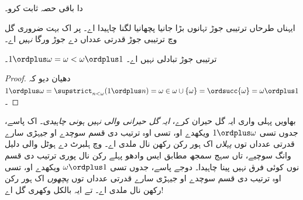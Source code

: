 \documentclass[../../../include/open-logic-section]{subfiles}
\begin{document}
\begin{prob}
 دا باقی حصہ ثابت کرو۔
\end{prob}

ایہناں طرحاں ترتیبی جوڑ تہانوں بڑا جانیا پچھانیا لگنا چاہیدا اے۔ پر اک بہت ضروری گل وچ ترتیبی جوڑ قدرتی عدداں دے جوڑ ورگا \emph{نہیں} اے۔

\begin{prop}
ترتیبی جوڑ {تبادلی نہیں} اے۔ $1 \ordplus  \omega = \omega <
\omega \ordplus  1$۔
\end{prop}

\begin{proof}
دھیان دیو کہ $1 \ordplus  \omega = \supstrict_{n < \omega} (1 \ordplus n)
= \omega \in \omega \cup \{\omega\} = \ordsucc{\omega} = \omega
\ordplus  1$۔
\end{proof}
\noindent
بھاویں پہلی واری ایہ گل حیران کرے، \emph{ایہ گل حیرانی والی نہیں ہونی چاہیدی}۔ اک پاسے، جدوں تسی $1 \ordplus  \omega$ ویکھدے او، تسی اوہ ترتیب دی قسم سوچدے او جیہڑی سارے قدرتی عدداں توں \emph{پہلاں} اک ہور رکن رکھن نال ملدی اے۔  وچ ہلبرٹ دے ہوٹل والی دلیل وانگ سوچیے، تاں سہج سمجھ مطابق ایس وادھو پہلے رکن نال پوری ترتیب دی قسم نوں کوئی فرق نہیں پینا چاہیدا۔ دوجے پاسے، جدوں تسی $\omega \ordplus  1$ ویکھدے او، تسی اوہ ترتیب دی قسم سوچدے او جیہڑی سارے قدرتی عدداں توں \emph{پچھوں} اک ہور رکن رکھن نال ملدی اے۔ تے ایہ بالکل وکھری گل اے!
\end{document}
